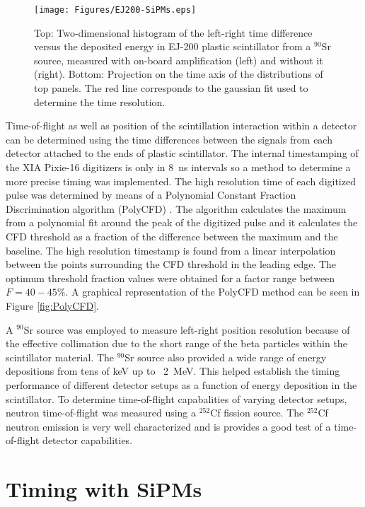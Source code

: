 \begin{figure}[tp]
\centering
\texttt{[image: Figures/EJ200-SiPMs.eps]}
\caption{Top: Two-dimensional histogram of the left-right time difference versus the deposited energy in EJ-200 plastic scintillator from a $^{90}$Sr source, measured with on-board amplification (left) and without it (right). Bottom: Projection on the time axis of the  distributions of top panels. The red line corresponds to the gaussian fit used to determine the time resolution.}
\label{fig:SiPMtiming}
\end{figure}
Time-of-flight as well as position of the scintillation interaction within a detector can be determined using the time differences between the signals from each detector attached to the ends of plastic scintillator. The internal timestamping of the XIA Pixie-16 digitizers is only in 8~ns intervals so a method to determine a more precise timing was implemented.
The high resolution time of each digitized pulse was determined by means of a Polynomial Constant Fraction Discrimination  algorithm (PolyCFD) \cite{PhDCory}. The algorithm calculates the maximum from a polynomial fit around the peak of the digitized pulse and it calculates the CFD threshold as a fraction of the difference between the maximum and the baseline. The high resolution timestamp is found from a linear interpolation between the points surrounding the CFD threshold in the leading edge. The optimum threshold fraction values were obtained for a factor range between $F=40-45\%$. A graphical representation of the PolyCFD method can be seen in Figure \ref{fig:PolyCFD}.

A $^{90}$Sr source was employed to measure left-right position resolution because of the effective collimation due to the short range of the beta particles within the scintillator material. The $^{90}$Sr source also provided a wide range of energy depositions from tens of keV up to ~2~MeV. This helped establish the timing performance of different detector setups as a function of energy deposition in the scintillator. To determine time-of-flight capabalities of varying detector setups, neutron time-of-flight was measured using a $^{252}$Cf fission source. The $^{252}$Cf neutron emission is very well characterized and is provides a good test of a time-of-flight detector capabilities. 

\section{Timing with SiPMs} \label{sec:timingWithSiPMs}

